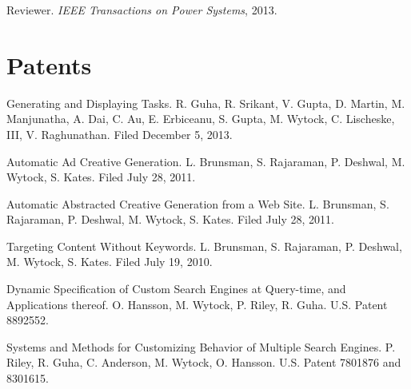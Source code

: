 \documentclass[margin, line]{res}
\begin{document}
\begin{resume}
Reviewer. \emph{IEEE Transactions on Power Systems}, 2013.

\section{Patents}

Generating and Displaying Tasks. R. Guha, R. Srikant, V. Gupta, D. Martin,
M. Manjunatha, A. Dai, C. Au,  E. Erbiceanu, S. Gupta, M. Wytock, C. Lischeske,
III, V. Raghunathan. Filed December 5, 2013.

Automatic Ad Creative Generation. L. Brunsman, S. Rajaraman, P. Deshwal,
M. Wytock, S. Kates. Filed July 28, 2011.

Automatic Abstracted Creative Generation from a Web Site. L. Brunsman,
S. Rajaraman, P. Deshwal, M. Wytock, S. Kates. Filed July 28, 2011.

Targeting Content Without Keywords. L. Brunsman, S. Rajaraman, P. Deshwal,
M. Wytock, S. Kates. Filed July 19, 2010.

Dynamic Specification of Custom Search Engines at Query-time, and Applications
thereof. O. Hansson, M. Wytock, P. Riley, R. Guha. U.S. Patent 8892552.

Systems and Methods for Customizing Behavior of Multiple Search
Engines. P. Riley, R. Guha, C. Anderson, M. Wytock, O. Hansson. U.S. Patent 7801876 and 8301615.

\end{resume}
\end{document}
